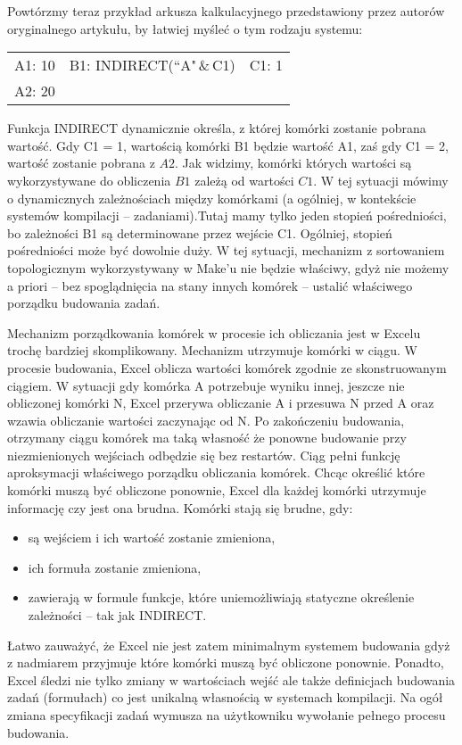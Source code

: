 Powtórzmy teraz przykład arkusza kalkulacyjnego przedstawiony przez autorów oryginalnego artykułu, by łatwiej myśleć o tym rodzaju systemu:

\begin{tabular}{ l c r }
  A1: 10 & B1: INDIRECT(``A"\,\&\,C1) & C1: 1 \\
  A2: 20 & &
\end{tabular}

Funkcja INDIRECT dynamicznie określa, z której komórki zostanie pobrana wartość. Gdy C1 = 1, wartością komórki B1 będzie wartość A1, zaś gdy C1 = 2, wartość zostanie pobrana z \(A2\). Jak widzimy, komórki których wartości są wykorzystywane do obliczenia \(B1\) zależą od wartości \(C1\). W tej sytuacji mówimy o dynamicznych zależnościach między komórkami (a ogólniej, w kontekście systemów kompilacji -- zadaniami).Tutaj mamy tylko jeden stopień pośredniości, bo zależności B1 są determinowane przez wejście C1. Ogólniej, stopień pośredniości może być dowolnie duży. W tej sytuacji, mechanizm z sortowaniem topologicznym wykorzystywany w Make'u nie będzie właściwy, gdyż nie możemy a priori -- bez spoglądnięcia na stany innych komórek -- ustalić właściwego porządku budowania zadań.

Mechanizm porządkowania komórek w procesie ich obliczania jest w Excelu trochę bardziej skomplikowany. Mechanizm utrzymuje komórki w ciągu. W procesie budowania, Excel oblicza wartości komórek zgodnie ze skonstruowanym ciągiem. W sytuacji gdy komórka A potrzebuje wyniku innej, jeszcze nie obliczonej komórki N, Excel przerywa obliczanie A i przesuwa N przed A oraz wzawia obliczanie wartości zaczynając od N. Po zakończeniu budowania, otrzymany ciągu komórek ma taką własność że ponowne budowanie przy niezmienionych wejściach odbędzie się bez restartów. Ciąg pełni funkcję aproksymacji właściwego porządku obliczania komórek. Chcąc określić które komórki muszą być obliczone ponownie, Excel dla każdej komórki utrzymuje informację czy jest ona brudna. Komórki stają się brudne, gdy:
\begin{itemize}
\item są wejściem i ich wartość zostanie zmieniona,
\item ich formuła zostanie zmieniona,
\item zawierają w formule funkcje, które uniemożliwiają statyczne określenie zależności -- tak jak INDIRECT.
\end{itemize}

Łatwo zauważyć, że Excel nie jest zatem minimalnym systemem budowania gdyż z nadmiarem przyjmuje które komórki muszą być obliczone ponownie. Ponadto, Excel śledzi nie tylko zmiany w wartościach wejść ale także definicjach budowania zadań (formułach) co jest unikalną własnością w systemach kompilacji. Na ogół zmiana specyfikacji zadań wymusza na użytkowniku wywołanie pełnego procesu budowania.


